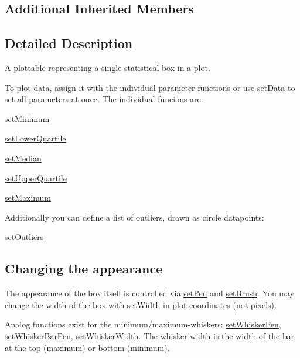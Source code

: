 \subsection*{Additional Inherited Members}


\subsection{Detailed Description}
A plottable representing a single statistical box in a plot. 

To plot data, assign it with the individual parameter functions or use \hyperlink{classQCPStatisticalBox_adf50c57b635edb12470c0e4a986aff37}{set\-Data} to set all parameters at once. The individual funcions are\-: \begin{DoxyItemize}
\item \hyperlink{classQCPStatisticalBox_a84ff7cc61ba44890f0c3e0c99c19941e}{set\-Minimum} \item \hyperlink{classQCPStatisticalBox_a680941af5e23d902013962fa67223f9e}{set\-Lower\-Quartile} \item \hyperlink{classQCPStatisticalBox_a65970e77a897da4ecb4b15300868aad3}{set\-Median} \item \hyperlink{classQCPStatisticalBox_a65a1375f941c5a2077b5201229e89346}{set\-Upper\-Quartile} \item \hyperlink{classQCPStatisticalBox_acec5ad1901f00f2c5387cfb4d9787eb3}{set\-Maximum}\end{DoxyItemize}
Additionally you can define a list of outliers, drawn as circle datapoints\-: \begin{DoxyItemize}
\item \hyperlink{classQCPStatisticalBox_af9bc09620e0bf93bf444ee35e5800d1d}{set\-Outliers}\end{DoxyItemize}
\hypertarget{classQCPStatisticalBox_appearance}{}\subsection{Changing the appearance}\label{classQCPStatisticalBox_appearance}
The appearance of the box itself is controlled via \hyperlink{classQCPAbstractPlottable_ab74b09ae4c0e7e13142fe4b5bf46cac7}{set\-Pen} and \hyperlink{classQCPAbstractPlottable_a7a4b92144dca6453a1f0f210e27edc74}{set\-Brush}. You may change the width of the box with \hyperlink{classQCPStatisticalBox_a0b62775bd67301b1eba5c785f2b26f14}{set\-Width} in plot coordinates (not pixels).

Analog functions exist for the minimum/maximum-\/whiskers\-: \hyperlink{classQCPStatisticalBox_a4a5034cb3b9b040444df05ab1684620b}{set\-Whisker\-Pen}, \hyperlink{classQCPStatisticalBox_aa8d3e503897788e1abf68dc74b5f147f}{set\-Whisker\-Bar\-Pen}, \hyperlink{classQCPStatisticalBox_adf378812446bd66f34d1f7f293d991cd}{set\-Whisker\-Width}. The whisker width is the width of the bar at the top (maximum) or bottom (minimum).


